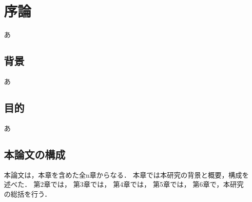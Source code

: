 
\renewcommand{\part}{Contents}
\renewcommand{\prechaptername}{第 }
\renewcommand{\postchaptername}{ 章}

\chapter{序論}
  あ
  
  \section{背景}
    あ
  
  \section{目的}
    あ
  
  \section{本論文の構成}
    
    本論文は，本章を含めた全n章からなる．
    本章では本研究の背景と概要，構成を述べた．
    第2章では，
    第3章では，
    第4章では，
    第5章では，
    第6章で，本研究の総括を行う．
